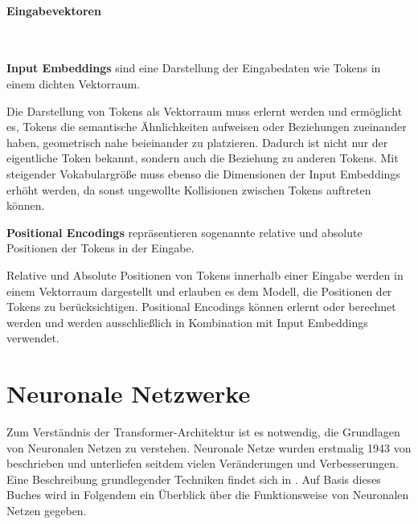 \paragraph{Eingabevektoren}\mbox{} \\

\begin{definition}\label{def:input-embeddings}
    \textbf{Input Embeddings} sind eine Darstellung der Eingabedaten wie Tokens in einem dichten Vektorraum.
\end{definition}
Die Darstellung von Tokens als Vektorraum muss erlernt werden und ermöglicht es,
Tokens die semantische Ähnlichkeiten aufweisen oder Beziehungen zueinander haben, geometrisch nahe beieinander zu platzieren.
Dadurch ist nicht nur der eigentliche Token bekannt, sondern auch die Beziehung zu anderen Tokens. Mit steigender Vokabulargröße muss ebenso die Dimensionen der Input Embeddings erhöht werden, da sonst ungewollte Kollisionen zwischen Tokens auftreten können.

\begin{definition}\label{def:positional-encodings}
    \textbf{Positional Encodings} repräsentieren sogenannte relative und absolute Positionen der Tokens in der Eingabe.
\end{definition}
Relative und Absolute Positionen von Tokens innerhalb einer Eingabe werden in einem Vektorraum dargestellt und erlauben es dem Modell, die Positionen der Tokens zu berücksichtigen.
Positional Encodings können erlernt oder berechnet werden und werden ausschließlich in Kombination mit Input Embeddings verwendet.

\section{Neuronale Netzwerke}
Zum Verständnis der Transformer-Architektur ist es notwendig, die Grundlagen von Neuronalen Netzen zu verstehen.
Neuronale Netze wurden erstmalig 1943 von \citet{neuronal_networks_first} beschrieben und unterliefen seitdem vielen Veränderungen und Verbesserungen.
Eine Beschreibung grundlegender Techniken findet sich in \citet{neuronale-netze}.
Auf Basis dieses Buches wird in Folgendem ein Überblick über die Funktionsweise von Neuronalen Netzen gegeben.\\

